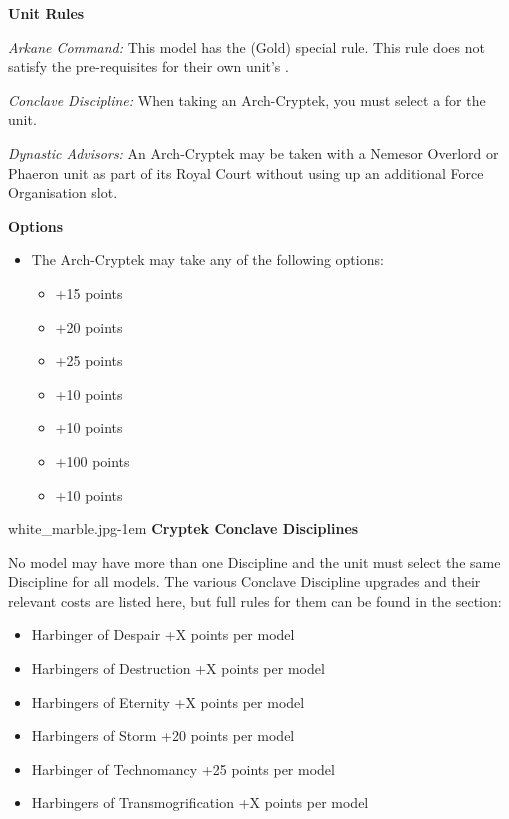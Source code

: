 \begin{minipage}[t]{0.72\textwidth}
	\vspace*{2em}	
	\textbf{Unit Rules}
	
	\textit{Arkane Command:} This model has the  (Gold) special rule. This rule does not satisfy the pre-requisites for their own unit's .
	
	\textit{Conclave Discipline:} When taking an Arch-Cryptek, you must select a  for the unit.
	
	\textit{Dynastic Advisors:} An Arch-Cryptek may be taken with a Nemesor Overlord or Phaeron unit as part of its Royal Court without using up an additional Force Organisation slot.
	
	\vspace*{2em}
	\textbf{Options}
	\begin{itemize}
		\item The Arch-Cryptek may take any of the following options:
		\begin{itemize}
			\item {} \dotfill +15 points
			\item {} \dotfill +20 points
			\item {} \dotfill +25 points
			\item {} \dotfill +10 points
			\item {} \dotfill +10 points
			\item {} \dotfill +100 points
			\item {} \dotfill +10 points
		\end{itemize}
	\end{itemize}
	
	\vspace*{3em}
	\begin{imgminipage}{white_marble.jpg}{\textwidth-1em}
		\textbf{Cryptek Conclave Disciplines}
		
		No model may have more than one Discipline and the unit must select the same Discipline for all models. The various Conclave Discipline upgrades and their relevant costs are listed here, but full rules for them can be found in the  section:
		\begin{itemize}
			\item Harbinger of Despair \dotfill +X points per model
			\item Harbingers of Destruction \dotfill +X points per model
			\item Harbingers of Eternity \dotfill +X points per model
			\item Harbingers of Storm \dotfill +20 points per model
			\item Harbinger of Technomancy \dotfill +25 points per model
			\item Harbingers of Transmogrification \dotfill +X points per model
		\end{itemize}
	\end{imgminipage}
\end{minipage}
